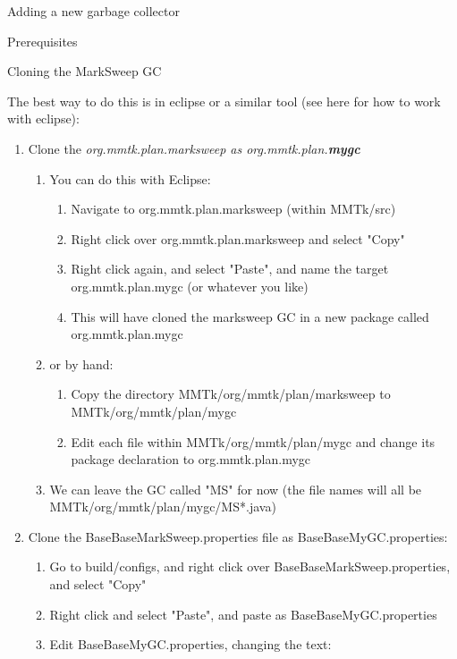 \begin{section}{Adding a new garbage collector}
\begin{subsection}{Prerequisites}
\end{subsection}

\begin{subsection}{Cloning the MarkSweep GC}

 The best way to do this is in eclipse or a similar tool (see here for how to work with eclipse):
\begin{enumerate}
    \item Clone the \textit{org.mmtk.plan.marksweep as org.mmtk.plan.\textbf{mygc}}
      \begin{enumerate}
        \item You can do this with Eclipse:
          \begin{enumerate}
            \item Navigate to org.mmtk.plan.marksweep (within MMTk/src)
            \item Right click over org.mmtk.plan.marksweep and select "Copy"
            \item Right click again, and select "Paste", and name the target \newline org.mmtk.plan.mygc (or whatever you like)
            \item This will have cloned the marksweep GC in a new package called org.mmtk.plan.mygc
          \end{enumerate}
        \item or by hand:
          \begin{enumerate}
            \item Copy the directory MMTk/org/mmtk/plan/marksweep to \newline MMTk/org/mmtk/plan/mygc
            \item Edit each file within MMTk/org/mmtk/plan/mygc and change its package declaration to org.mmtk.plan.mygc
          \end{enumerate}
        \item We can leave the GC called "MS" for now (the file names will all be MMTk/org/mmtk/plan/mygc/MS*.java)
      \end{enumerate}
    \item Clone the BaseBaseMarkSweep.properties file as BaseBaseMyGC.properties:
      \begin{enumerate}
        \item Go to build/configs, and right click over BaseBaseMarkSweep.properties, and select "Copy"
        \item Right click and select "Paste", and paste as BaseBaseMyGC.properties
        \item Edit BaseBaseMyGC.properties, changing the text:

\end{enumerate}
\end{enumerate}
\end{subsection}
\end{section}
